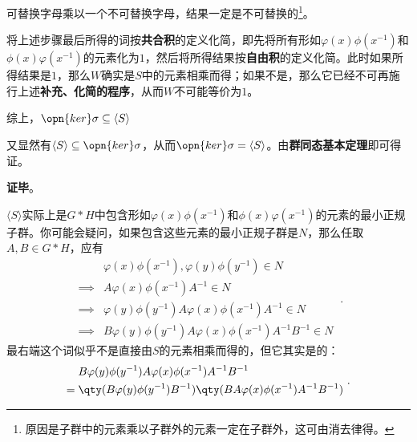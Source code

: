 可替换字母乘以一个不可替换字母，结果一定是不可替换的\footnote{原因是子群中的元素乘以子群外的元素一定在子群外，这可由消去律得。}。

将上述步骤最后所得的词按\textbf{共合积}的定义化简，即先将所有形如$\varphi(x)\phi(x^{-1})$和$\phi(x)\varphi(x^{-1})$的元素化为$1$，然后将所得结果按\textbf{自由积}的定义化简。此时如果所得结果是$1$，那么$W$确实是$S$中的元素相乘而得；如果不是，那么它已经不可再施行上述\textbf{补充、化简的程序}，从而$W$不可能等价为$1$。

综上，$\opn{ker}\sigma\subseteq \langle S \rangle $

又显然有$\langle S \rangle \subseteq \opn{ker}\sigma$，从而$\opn{ker}\sigma=\langle S \rangle$。由\textbf{群同态基本定理}即可得证。

\textbf{证毕}。




$\langle S \rangle$实际上是$G*H$中包含形如$\varphi(x)\phi(x^{-1})$和$\phi(x)\varphi(x^{-1})$的元素的最小正规子群。你可能会疑问，如果包含这些元素的最小正规子群是$N$，那么任取$A, B\in G*H$，应有
\begin{equation}
\begin{aligned}
&\varphi(x)\phi(x^{-1}), \varphi(y)\phi(y^{-1})\in N \\
\implies{}& A\varphi(x)\phi(x^{-1})A^{-1}\in N\\
\implies{}& \varphi(y)\phi(y^{-1})A\varphi(x)\phi(x^{-1})A^{-1}\in N\\
\implies{}& B\varphi(y)\phi(y^{-1})A\varphi(x)\phi(x^{-1})A^{-1}B^{-1}\in N
\end{aligned}
~.
\end{equation}
最右端这个词似乎不是直接由$S$的元素相乘而得的，但它其实是的：
\begin{equation}
\begin{aligned}
&B\varphi(y)\phi(y^{-1})A\varphi(x)\phi(x^{-1})A^{-1}B^{-1} \\
={}& \qty(B\varphi(y)\phi(y^{-1})B^{-1})\qty(BA\varphi(x)\phi(x^{-1})A^{-1}B^{-1})
\end{aligned}
~.
\end{equation}
















